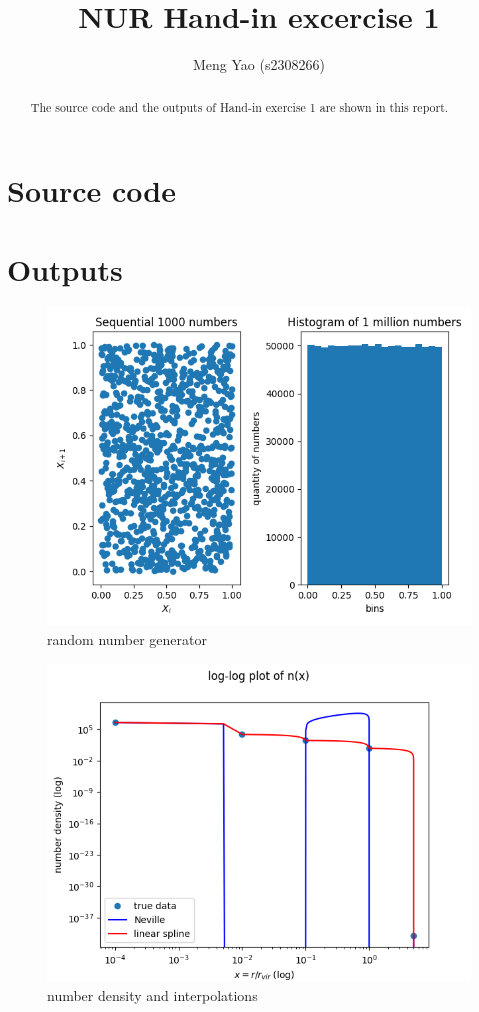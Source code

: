 \documentclass[a4paper,10pt]{article}
\title{NUR Hand-in excercise 1}
\author{Meng Yao (s2308266)}
\begin{document}
\maketitle

\begin{abstract}
 The source code and the outputs of Hand-in exercise 1 are shown in this report.
\end{abstract}

\section{Source code}


\section{Outputs}

\begin{figure}
    \centering
    \includegraphics[width=1.\linewidth]{1.png}
    \caption{random number generator}
    \label{fig:my_label}
\end{figure}
\begin{figure}
    \centering
    \includegraphics[width=1.\linewidth]{2b.png}
    \caption{number density and interpolations}
    \label{fig:my_label}
\end{figure}
\end{document}
